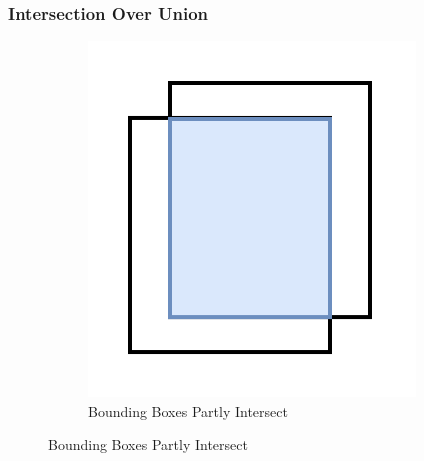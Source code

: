   \subsubsection{Intersection Over Union}
   \begin{figure}[p]
        \centering
        \begin{subfigure}[][][t]{\textwidth}
          \centering
          \includegraphics[width=.33\linewidth]{figures/iou-intersect-partly.png}
          \caption{Bounding Boxes Partly Intersect}
          \label{fig:iou-intersect-partly}
        \end{subfigure}


\end{figure}
